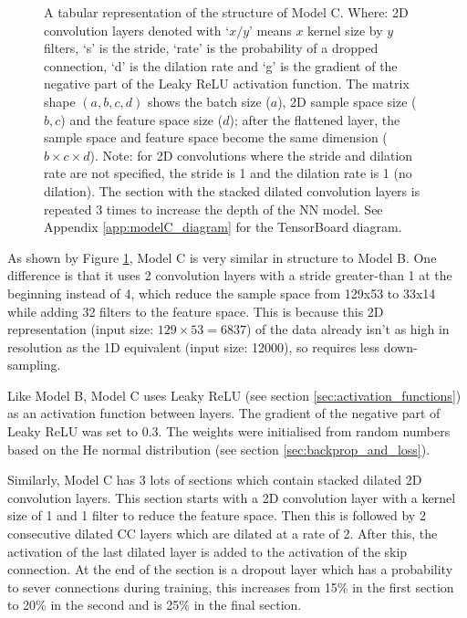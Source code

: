 \documentclass[12pt]{article}
\begin{document}
\begin{figure}[H]
        \caption{\footnotesize{A tabular representation of the structure of Model C. Where: 2D convolution layers denoted with `$x/y$' means $x$ kernel size by $y$ filters, `s' is the stride, `rate' is the probability of a dropped connection, `d' is the dilation rate and `g' is the gradient of the negative part of the Leaky ReLU activation function. The matrix shape $(a, b, c, d)$ shows the batch size ($a$), 2D sample space size ($b, c$) and the feature space size ($d$); after the flattened layer, the sample space and feature space become the same dimension ($b \times c \times d$). Note: for 2D convolutions where the stride and dilation rate are not specified, the stride is 1 and the dilation rate is 1 (no dilation). The section with the stacked dilated convolution layers is repeated 3 times to increase the depth of the NN model. See Appendix \ref{app:modelC_diagram} for the TensorBoard diagram.}}
        \label{fig:modelC_structure}
    \end{figure}
    
    As shown by Figure \ref{fig:modelC_structure}, Model C is very similar in structure to Model B. One difference is that it uses 2 convolution layers with a stride greater-than 1 at the beginning instead of 4, which reduce the sample space from 129x53 to 33x14 while adding 32 filters to the feature space. This is because this 2D representation (input size: $129\times 53 = 6837$) of the data already isn't as high in resolution as the 1D equivalent (input size: 12000), so requires less down-sampling.\medskip
    
    Like Model B, Model C uses Leaky ReLU (see section \ref{sec:activation_functions}) as an activation function between layers. The gradient of the negative part of Leaky ReLU was set to 0.3. The weights were initialised from random numbers based on the He normal distribution (see section \ref{sec:backprop_and_loss}).\medskip
    
    Similarly, Model C has 3 lots of sections which contain stacked dilated 2D convolution layers. This section starts with a 2D convolution layer with a kernel size of 1 and 1 filter to reduce the feature space. Then this is followed by 2 consecutive dilated CC layers which are dilated at a rate of 2. After this, the activation of the last dilated layer is added to the activation of the skip connection. At the end of the section is a dropout layer which has a probability to sever connections during training, this increases from 15\% in the first section to 20\% in the second and is 25\% in the final section.\medskip
    
\end{document}

